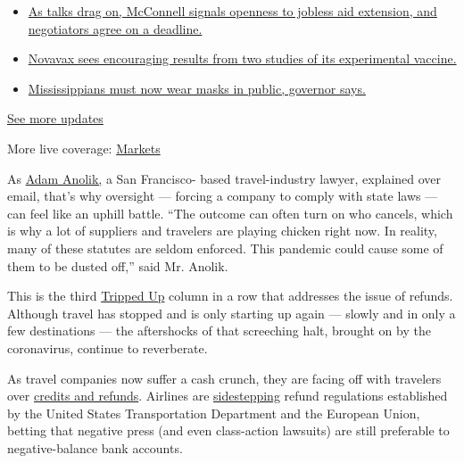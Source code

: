 \begin{itemize}
\tightlist
\item
  \href{https://www.nytimes.com/2020/08/04/world/coronavirus-cases.html?action=click\&pgtype=Article\&state=default\&region=MAIN_CONTENT_1\&context=storylines_live_updates\#link-762df92}{As
  talks drag on, McConnell signals openness to jobless aid extension,
  and negotiators agree on a deadline.}
\item
  \href{https://www.nytimes.com/2020/08/04/world/coronavirus-cases.html?action=click\&pgtype=Article\&state=default\&region=MAIN_CONTENT_1\&context=storylines_live_updates\#link-1228a480}{Novavax
  sees encouraging results from two studies of its experimental
  vaccine.}
\item
  \href{https://www.nytimes.com/2020/08/04/world/coronavirus-cases.html?action=click\&pgtype=Article\&state=default\&region=MAIN_CONTENT_1\&context=storylines_live_updates\#link-794484ed}{Mississippians
  must now wear masks in public, governor says.}
\end{itemize}

\href{https://www.nytimes.com/2020/08/04/world/coronavirus-cases.html?action=click\&pgtype=Article\&state=default\&region=MAIN_CONTENT_1\&context=storylines_live_updates}{See
more updates}

More live coverage:
\href{https://www.nytimes.com/live/2020/08/04/business/stock-market-today-coronavirus?action=click\&pgtype=Article\&state=default\&region=MAIN_CONTENT_1\&context=storylines_live_updates}{Markets}

As \href{https://travellaw.com/}{Adam Anolik,} a San Francisco- based
travel-industry lawyer, explained over email, that's why oversight ---
forcing a company to comply with state laws --- can feel like an uphill
battle. ``The outcome can often turn on who cancels, which is why a lot
of suppliers and travelers are playing chicken right now. In reality,
many of these statutes are seldom enforced. This pandemic could cause
some of them to be dusted off,'' said Mr. Anolik.

This is the third
\href{https://www.nytimes.com/column/tripped-up}{Tripped Up} column in a
row that addresses the issue of refunds. Although travel has stopped and
is only starting up again --- slowly and in only a few destinations ---
the aftershocks of that screeching halt, brought on by the coronavirus,
continue to reverberate.

As travel companies now suffer a cash crunch, they are facing off with
travelers over
\href{https://www.nytimes.com/2020/05/12/travel/refunds-or-credits-travelers-and-businesses-face-off.html}{credits
and refunds}. Airlines are
\href{https://www.nytimes.com/2020/05/01/travel/trip-refund-airlines.html}{sidestepping}
refund regulations established by the United States Transportation
Department and the European Union, betting that negative press (and even
class-action lawsuits) are still preferable to negative-balance bank
accounts.

